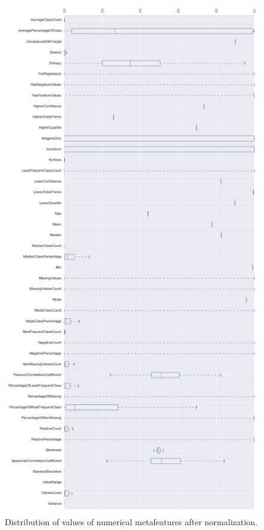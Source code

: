 \begin{figure}
	\includegraphics[width=12cm]{Images/numericalAttributeDistribution.png}
	\centering
	\caption{Distribution of values of numerical metafeatures after normalization.}
	\label{fig:numericalAttributeDistribution}	
\end{figure}
 

 